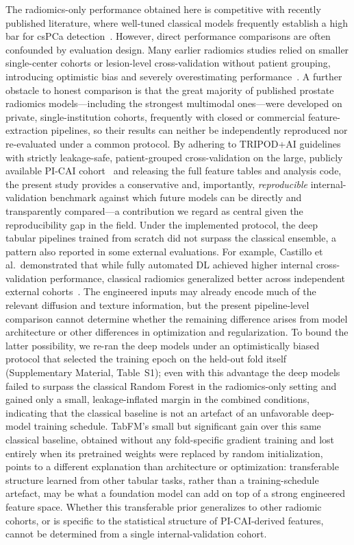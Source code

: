 \documentclass[11pt]{article}
\begin{document}
The radiomics-only performance obtained here is competitive with recently published
literature, where well-tuned classical models frequently establish a high bar for csPCa
detection~\citep{cuocolo2021machine,Bao2024,Lucia2024}. However, direct performance comparisons
are often confounded by evaluation design. Many earlier radiomics studies relied on smaller
single-center cohorts or lesion-level cross-validation without patient grouping, introducing
optimistic bias and severely overestimating performance~\citep{Quality2022}. A further obstacle to
honest comparison is that the great majority of published prostate radiomics models---including the
strongest multimodal ones---were developed on private, single-institution cohorts, frequently with
closed or commercial feature-extraction pipelines, so their results can neither be independently
reproduced nor re-evaluated under a common protocol. By adhering to
TRIPOD+AI guidelines with strictly leakage-safe, patient-grouped cross-validation on the
large, publicly available PI-CAI cohort~\citep{collins2024tripodai,saha2023artificial} and releasing the
full feature tables and analysis code, the present study provides a conservative and, importantly,
\emph{reproducible} internal-validation benchmark against which future models can be directly and
transparently compared---a contribution we regard as central given the reproducibility gap in the
field. Under the implemented protocol, the deep tabular
pipelines trained from scratch did not surpass the classical ensemble, a
pattern also reported in some external evaluations.
For example, Castillo et al.\ demonstrated that while fully automated DL achieved higher internal
cross-validation performance, classical radiomics generalized better across independent external
cohorts~\citep{Castillo2022Cancers}. The engineered inputs may already encode
much of the relevant diffusion and texture information, but the present
pipeline-level comparison cannot determine whether the remaining difference
arises from model architecture or other differences in optimization and
regularization. To bound the latter possibility, we re-ran the deep models under
an optimistically biased protocol that selected the training epoch on the
held-out fold itself (Supplementary Material, Table~S1); even with this advantage the
deep models failed to surpass the classical Random Forest in the radiomics-only
setting and gained only a small, leakage-inflated margin in the combined
conditions, indicating that the classical baseline is not an artefact of an
unfavorable deep-model training schedule. TabFM's small but significant gain
over this same classical baseline, obtained without any fold-specific gradient
training and lost entirely when its pretrained weights were replaced by random
initialization, points to a different explanation than architecture or
optimization: transferable structure learned from other tabular tasks, rather
than a training-schedule artefact, may be what a foundation model can add on
top of a strong engineered feature space. Whether this transferable prior
generalizes to other radiomic cohorts, or is specific to the statistical
structure of PI-CAI-derived features, cannot be determined from a single
internal-validation cohort.
\end{document}
